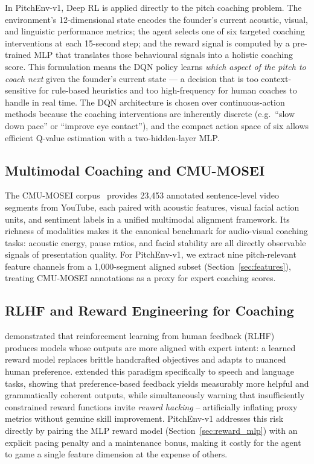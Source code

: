 \documentclass{article}
\begin{document}
In PitchEnv-v1, Deep RL is applied directly to the pitch coaching problem.
The environment's 12-dimensional state encodes the founder's current
acoustic, visual, and linguistic performance metrics; the agent selects
one of six targeted coaching interventions at each 15-second step; and the
reward signal is computed by a pre-trained MLP that translates those
behavioural signals into a holistic coaching score. This formulation
means the DQN policy learns \emph{which aspect of the pitch to coach next}
given the founder's current state --- a decision that is too context-sensitive
for rule-based heuristics and too high-frequency for human coaches to handle
in real time. The DQN architecture is chosen over continuous-action methods
because the coaching interventions are inherently discrete (e.g.~``slow down
pace'' or ``improve eye contact''), and the compact action space of six
allows efficient Q-value estimation with a two-hidden-layer MLP.

\FloatBarrier
\subsection{Multimodal Coaching and CMU-MOSEI}

The CMU-MOSEI corpus~\citep{zadeh2018} provides 23{,}453 annotated
sentence-level video segments from YouTube, each paired with acoustic
features, visual facial action units, and sentiment labels in a unified
multimodal alignment framework. Its richness of modalities makes it the
canonical benchmark for audio-visual coaching tasks: acoustic energy,
pause ratios, and facial stability are all directly observable signals of
presentation quality. For PitchEnv-v1, we extract nine pitch-relevant
feature channels from a 1{,}000-segment aligned subset
(Section~\ref{sec:features}), treating CMU-MOSEI annotations as a
proxy for expert coaching scores.

\FloatBarrier
\subsection{RLHF and Reward Engineering for Coaching}

\citet{ouyang2022instructgpt} demonstrated that reinforcement learning
from human feedback (RLHF) produces models whose outputs are more aligned
with expert intent: a learned reward model replaces brittle
handcrafted objectives and adapts to nuanced human preference.
\citet{wang2025rlhf} extended this paradigm specifically to speech and
language tasks, showing that preference-based feedback yields measurably
more helpful and grammatically coherent outputs, while simultaneously
warning that insufficiently constrained reward functions invite
\emph{reward hacking} -- artificially inflating proxy metrics without
genuine skill improvement. PitchEnv-v1 addresses this risk directly by
pairing the MLP reward model (Section~\ref{sec:reward_mlp}) with an
explicit pacing penalty and a maintenance bonus, making it costly for
the agent to game a single feature dimension at the expense of others.
\end{document}
